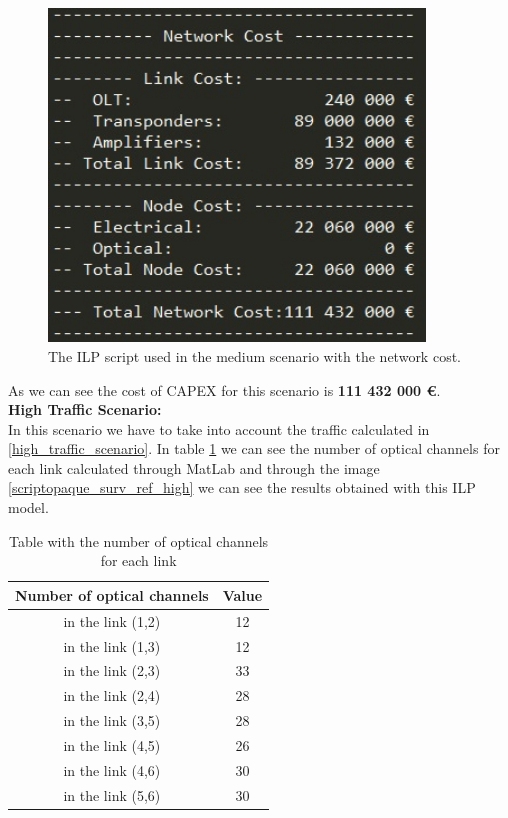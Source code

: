 \begin{figure}[h!]
\centering
\includegraphics[width=10cm]{sdf/ilp/opaque_protection/figures/script_opaque_protec_ref_medium}
\caption{The ILP script used in the medium scenario with the network cost.}
\label{scriptopaque_surv_ref_medium}
\end{figure}

As we can see the cost of CAPEX for this scenario is \textbf{111 432 000 \euro}.\\


\textbf{High Traffic Scenario:}\\

In this scenario we have to take into account the traffic calculated in \ref{high_traffic_scenario}. In table \ref{result_ILP3P_reference} we can see the number of optical channels for each link calculated through MatLab and through the image \ref{scriptopaque_surv_ref_high} we can see the results obtained with this ILP model.\\

\begin{table}[h!]
\centering
\begin{tabular}{|| c | c||}
 \hline
 Number of optical channels & Value \\
 \hline\hline
 in the link (1,2) & 12 \\
 in the link (1,3) & 12 \\
 in the link (2,3) & 33 \\
 in the link (2,4) & 28 \\
 in the link (3,5) & 28 \\
 in the link (4,5) & 26 \\
 in the link (4,6) & 30 \\
 in the link (5,6) & 30 \\
 \hline
\end{tabular}
\caption{Table with the number of optical channels for each link}
\label{result_ILP3P_reference}
\end{table}
\newpage

